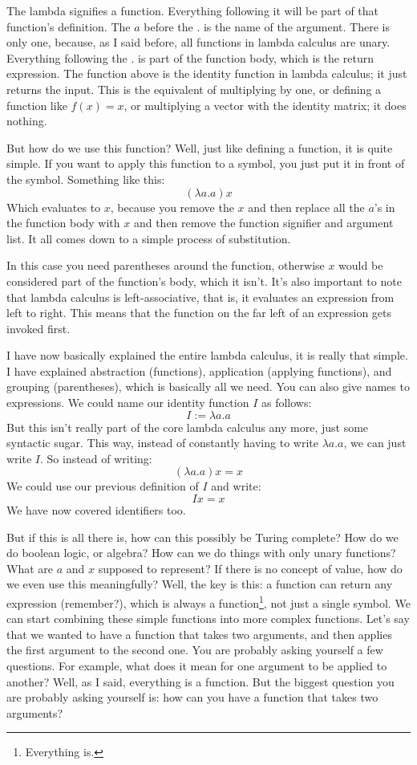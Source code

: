 \documentclass[11pt]{article}
\begin{document}
The lambda signifies a function. Everything following it will be part of that
function's definition. The \(a\) before the \(.\) is the name of the argument.
There is only one, because, as I said before, all functions in lambda calculus
are unary. Everything following the \(.\) is part of the function body, which
is the return expression. The function above is the identity function in lambda
calculus; it just returns the input. This is the equivalent of multiplying by
one, or defining a function like \(f(x)=x\), or multiplying a vector with the
identity matrix; it does nothing.

But how do we use this function? Well, just like defining a function, it is
quite simple. If you want to apply this function to a symbol, you just put it
in front of the symbol. Something like this:
\[(\lambda a.a)x\]
Which evaluates to \(x\), because you remove the \(x\) and then replace all the
\(a\)'s in the function body with \(x\) and then remove the function signifier
and argument list. It all comes down to a simple process of substitution.

In this case you need parentheses around the function, otherwise \(x\) would be
considered part of the function's body, which it isn't. It's also important to
note that lambda calculus is left-associative, that is, it evaluates an
expression from left to right. This means that the function on the far left of
an expression gets invoked first.

I have now basically explained the entire lambda calculus, it is really that
simple. I have explained abstraction (functions), application (applying
functions), and grouping (parentheses), which is basically all we need. You
can also give names to expressions. We could name our identity function \(I\)
as follows: \[I:=\lambda a.a\] But this isn't really part of the core lambda
calculus any more, just some syntactic sugar. This way, instead of constantly
having to write \(\lambda a.a\), we can just write \(I\). So instead of
writing: \[(\lambda a.a)x=x\] We could use our previous definition of \(I\) and
write: \[Ix=x\] We have now covered identifiers too.

But if this is all there is, how can this possibly be Turing complete? How do
we do boolean logic, or algebra? How can we do things with only unary
functions? What are \(a\) and \(x\) supposed to represent? If there is no
concept of value, how do we even use this meaningfully? Well, the key is this:
a function can return any expression (remember?), which is always a
function\footnote{Everything is.}, not just a single symbol. We can start
combining these simple functions into more complex functions. Let's say that we
wanted to have a function that takes two arguments, and then applies the first
argument to the second one. You are probably asking yourself a few questions.
For example, what does it mean for one argument to be applied to another? Well,
as I said, everything is a function. But the biggest question you are probably
asking yourself is: how can you have a function that takes two arguments?
\end{document}
